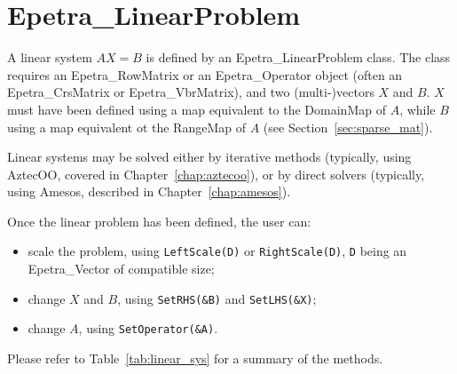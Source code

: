
\section{Epetra\_LinearProblem}
\label{sec:linear_problem}

A linear system $A X = B$ is defined by an Epetra\_LinearProblem class.
The class requires an Epetra\_RowMatrix or an Epetra\_Operator object
(often an Epetra\_CrsMatrix or Epetra\_VbrMatrix), and two
(multi-)vectors $X$ and $B$. $X$ must have been defined using a map
equivalent to the DomainMap of $A$, while $B$ using a map equivalent ot
the RangeMap of $A$ (see Section~\ref{sec:sparse_mat}).

Linear systems may be solved either by iterative methods (typically,
using AztecOO, covered in Chapter~\ref{chap:aztecoo}), or by direct
solvers (typically, using Amesos, described in
Chapter~\ref{chap:amesos}).

Once the linear problem has been defined, the user can:

\begin{itemize}
\item scale the problem, using \verb!LeftScale(D)! or
  \verb!RightScale(D)!, \verb!D! being an Epetra\_Vector of compatible
  size;
\item change $X$ and $B$, using \verb!SetRHS(&B)! and \verb!SetLHS(&X)!;
\item change $A$, using \verb!SetOperator(&A)!.
\end{itemize}

Please refer to Table~\ref{tab:linear_sys} for a summary of the methods.

